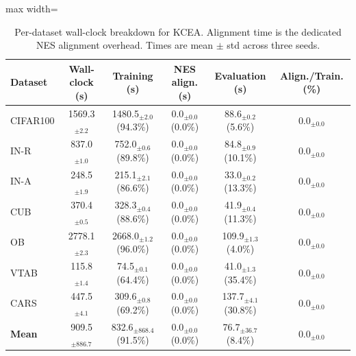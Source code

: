 \begin{table}[!t]
\centering
\caption{Per-dataset wall-clock breakdown for KCEA. Alignment time is the dedicated NES alignment overhead. Times are mean $\pm$ std across three seeds.}
\label{tab:cost-kcea-breakdown}
\renewcommand{\arraystretch}{0.95}
\begin{adjustbox}{max width=\textwidth}
\footnotesize
\begin{tabular}{l c c c c c}
\toprule
\textbf{Dataset} & \textbf{Wall-clock (s)} & \textbf{Training (s)} & \textbf{NES align. (s)} & \textbf{Evaluation (s)} & \textbf{Align./Train. (\%)} \\
\midrule
CIFAR100 & 1569.3$_{\pm 2.2}$ & 1480.5$_{\pm 2.0}$ (94.3\%) & 0.0$_{\pm 0.0}$ (0.0\%) & 88.6$_{\pm 0.2}$ (5.6\%) & 0.0$_{\pm 0.0}$ \\
IN-R & 837.0$_{\pm 1.0}$ & 752.0$_{\pm 0.6}$ (89.8\%) & 0.0$_{\pm 0.0}$ (0.0\%) & 84.8$_{\pm 0.9}$ (10.1\%) & 0.0$_{\pm 0.0}$ \\
IN-A & 248.5$_{\pm 1.9}$ & 215.1$_{\pm 2.1}$ (86.6\%) & 0.0$_{\pm 0.0}$ (0.0\%) & 33.0$_{\pm 0.2}$ (13.3\%) & 0.0$_{\pm 0.0}$ \\
CUB & 370.4$_{\pm 0.5}$ & 328.3$_{\pm 0.4}$ (88.6\%) & 0.0$_{\pm 0.0}$ (0.0\%) & 41.9$_{\pm 0.4}$ (11.3\%) & 0.0$_{\pm 0.0}$ \\
OB & 2778.1$_{\pm 2.3}$ & 2668.0$_{\pm 1.2}$ (96.0\%) & 0.0$_{\pm 0.0}$ (0.0\%) & 109.9$_{\pm 1.3}$ (4.0\%) & 0.0$_{\pm 0.0}$ \\
VTAB & 115.8$_{\pm 1.4}$ & 74.5$_{\pm 0.1}$ (64.4\%) & 0.0$_{\pm 0.0}$ (0.0\%) & 41.0$_{\pm 1.3}$ (35.4\%) & 0.0$_{\pm 0.0}$ \\
CARS & 447.5$_{\pm 4.1}$ & 309.6$_{\pm 0.8}$ (69.2\%) & 0.0$_{\pm 0.0}$ (0.0\%) & 137.7$_{\pm 4.1}$ (30.8\%) & 0.0$_{\pm 0.0}$ \\
\midrule
\textbf{Mean} & 909.5$_{\pm 886.7}$ & 832.6$_{\pm 868.4}$ (91.5\%) & 0.0$_{\pm 0.0}$ (0.0\%) & 76.7$_{\pm 36.7}$ (8.4\%) & 0.0$_{\pm 0.0}$ \\
\bottomrule
\end{tabular}
\end{adjustbox}
\end{table}